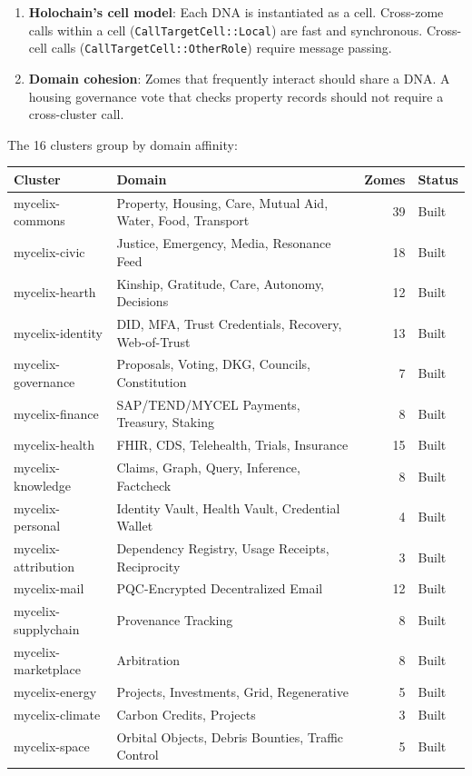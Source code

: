 \documentclass[12pt]{book}
\begin{document}
\begin{enumerate}
  \item \textbf{Holochain's cell model}: Each DNA is instantiated as a cell.
    Cross-zome calls within a cell (\texttt{CallTargetCell::Local}) are fast
    and synchronous. Cross-cell calls (\texttt{CallTargetCell::OtherRole})
    require message passing.
  \item \textbf{Domain cohesion}: Zomes that frequently interact should share
    a DNA. A housing governance vote that checks property records should not
    require a cross-cluster call.
\end{enumerate}

The 16 clusters group by domain affinity:

\begin{longtable}{llrl}
\toprule
\textbf{Cluster} & \textbf{Domain} & \textbf{Zomes} & \textbf{Status} \\
\midrule
\endhead
mycelix-commons & Property, Housing, Care, Mutual Aid, Water, Food, Transport & 39 & Built \\
mycelix-civic & Justice, Emergency, Media, Resonance Feed & 18 & Built \\
mycelix-hearth & Kinship, Gratitude, Care, Autonomy, Decisions & 12 & Built \\
mycelix-identity & DID, MFA, Trust Credentials, Recovery, Web-of-Trust & 13 & Built \\
mycelix-governance & Proposals, Voting, DKG, Councils, Constitution & 7 & Built \\
mycelix-finance & SAP/TEND/MYCEL Payments, Treasury, Staking & 8 & Built \\
mycelix-health & FHIR, CDS, Telehealth, Trials, Insurance & 15 & Built \\
mycelix-knowledge & Claims, Graph, Query, Inference, Factcheck & 8 & Built \\
mycelix-personal & Identity Vault, Health Vault, Credential Wallet & 4 & Built \\
mycelix-attribution & Dependency Registry, Usage Receipts, Reciprocity & 3 & Built \\
mycelix-mail & PQC-Encrypted Decentralized Email & 12 & Built \\
mycelix-supplychain & Provenance Tracking & 8 & Built \\
mycelix-marketplace & Arbitration & 8 & Built \\
mycelix-energy & Projects, Investments, Grid, Regenerative & 5 & Built \\
mycelix-climate & Carbon Credits, Projects & 3 & Built \\
mycelix-space & Orbital Objects, Debris Bounties, Traffic Control & 5 & Built \\
\bottomrule
\end{longtable}
\end{document}
